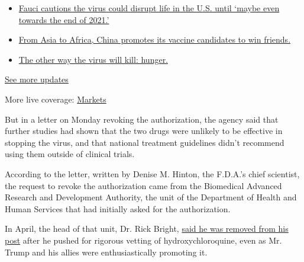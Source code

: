 \begin{itemize}
\tightlist
\item
  \href{https://www.nytimes3xbfgragh.onion/2020/09/11/world/covid-19-coronavirus.html?action=click\&pgtype=Article\&state=default\&region=MAIN_CONTENT_1\&context=storylines_live_updates\#link-dfb8a16}{Fauci
  cautions the virus could disrupt life in the U.S. until `maybe even
  towards the end of 2021.'}
\item
  \href{https://www.nytimes3xbfgragh.onion/2020/09/11/world/covid-19-coronavirus.html?action=click\&pgtype=Article\&state=default\&region=MAIN_CONTENT_1\&context=storylines_live_updates\#link-7104d154}{From
  Asia to Africa, China promotes its vaccine candidates to win friends.}
\item
  \href{https://www.nytimes3xbfgragh.onion/2020/09/11/world/covid-19-coronavirus.html?action=click\&pgtype=Article\&state=default\&region=MAIN_CONTENT_1\&context=storylines_live_updates\#link-393ad215}{The
  other way the virus will kill: hunger.}
\end{itemize}

\href{https://www.nytimes3xbfgragh.onion/2020/09/11/world/covid-19-coronavirus.html?action=click\&pgtype=Article\&state=default\&region=MAIN_CONTENT_1\&context=storylines_live_updates}{See
more updates}

More live coverage:
\href{https://www.nytimes3xbfgragh.onion/live/2020/09/11/business/stock-market-today-coronavirus?action=click\&pgtype=Article\&state=default\&region=MAIN_CONTENT_1\&context=storylines_live_updates}{Markets}

But in a letter on Monday revoking the authorization, the agency said
that further studies had shown that the two drugs were unlikely to be
effective in stopping the virus, and that national treatment guidelines
didn't recommend using them outside of clinical trials.

According to the letter, written by Denise M. Hinton, the F.D.A.'s chief
scientist, the request to revoke the authorization came from the
Biomedical Advanced Research and Development Authority, the unit of the
Department of Health and Human Services that had initially asked for the
authorization.

In April, the head of that unit, Dr. Rick Bright,
\href{https://www.nytimes3xbfgragh.onion/2020/04/22/us/politics/rick-bright-trump-hydroxychloroquine-coronavirus.html}{said
he was removed from his post} after he pushed for rigorous vetting of
hydroxychloroquine, even as Mr. Trump and his allies were
enthusiastically promoting it.


